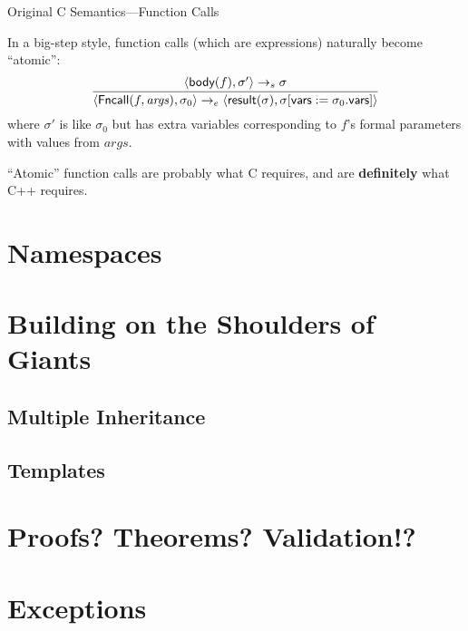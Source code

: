 \documentclass[compress,dvips,color=usenames,xcolor=dvipsnames]{beamer}
\newcommand{\cpp}{\mbox{C\hspace{-.1em}+\hspace{-.05em}+}}
\begin{document}
\begin{frame}{Original C Semantics---Function Calls}

  In a big-step style, function calls (which are expressions)
  naturally become ``atomic'':
  \[
  \infer{
    \langle \textsf{Fncall}(f,\mathit{args}), \sigma_0 \rangle \rightarrow_e
    \langle \textsf{result}(\sigma),
    \sigma[\textsf{vars} := \sigma_0.\textsf{vars}]
    \rangle
  }{
    \langle \textsf{body}(f), \sigma'\rangle \rightarrow_s \sigma
  }
\]
where $\sigma'$ is like $\sigma_0$ but has extra variables
corresponding to $f$'s formal parameters with values from
$\mathit{args}$.

\bigskip
``Atomic'' function calls are probably what C requires, and are
\textbf{definitely} what \cpp{} requires.


\end{frame}


\section{Namespaces}

\section{Building on the Shoulders of Giants}
\subsection{Multiple Inheritance}
\subsection{Templates}

\section{Proofs? Theorems?  Validation!?}


\section{Exceptions}
\end{document}
